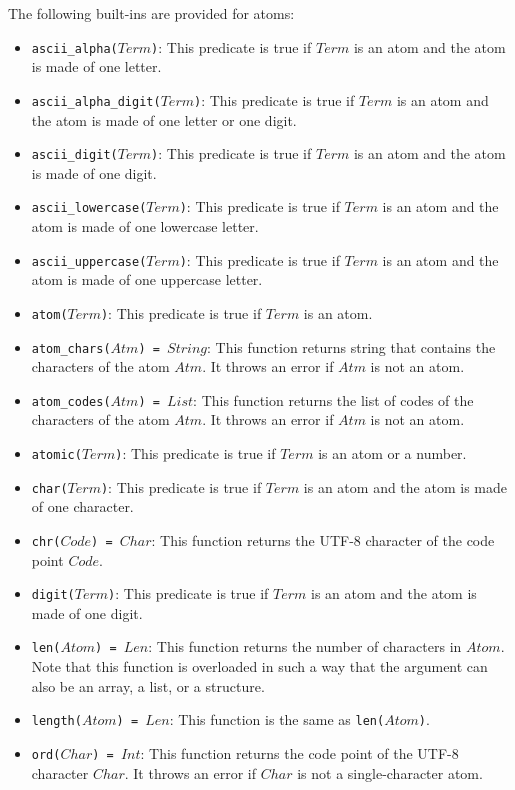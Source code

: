 The following built-ins are provided for atoms:
\begin{itemize}
\item \texttt{ascii\_alpha($Term$)}: This predicate is true if $Term$ is an atom and the atom is made of one letter.
\item \texttt{ascii\_alpha\_digit($Term$)}: This predicate is true if $Term$ is an atom and the atom is made of one letter or one digit.
\item \texttt{ascii\_digit($Term$)}: This predicate is true if $Term$ is an atom and the atom is made of one digit.
\item \texttt{ascii\_lowercase($Term$)}: This predicate is true if $Term$ is an atom and the atom is made of one lowercase letter.
\item \texttt{ascii\_uppercase($Term$)}: This predicate is true if $Term$ is an atom and the atom is made of one uppercase letter.
\item \texttt{atom($Term$)}: This predicate is true if $Term$ is an atom.
\item \texttt{atom\_chars($Atm$) = $String$}: This function returns string that contains the characters of the atom $Atm$. It throws an error if $Atm$ is not an atom.
\item \texttt{atom\_codes($Atm$) = $List$}: This function returns the list of codes of the characters of the atom $Atm$. It throws an error if $Atm$ is not an atom. 
\item \texttt{atomic($Term$)}: This predicate is true if $Term$ is an atom or a number.
\item \texttt{char($Term$)}: This predicate is true if $Term$ is an atom and the atom is made of one character.
\item \texttt{chr($Code$) = $Char$}: This function returns the UTF-8 character of the code point $Code$.  
\item \texttt{digit($Term$)}: This predicate is true if $Term$ is an atom and the atom is made of one digit.
\item \texttt{len($Atom$) = $Len$}: This function returns the number of characters in $Atom$. Note that this function is overloaded in such a way that the argument can also be an array, a list, or a structure.
\item \texttt{length($Atom$) = $Len$}: This function is the same as \texttt{len($Atom$)}.
\item \texttt{ord($Char$) = $Int$}: This function returns the code point of the UTF-8 character $Char$.  It throws an error if $Char$ is not a single-character atom.
\end{itemize}

